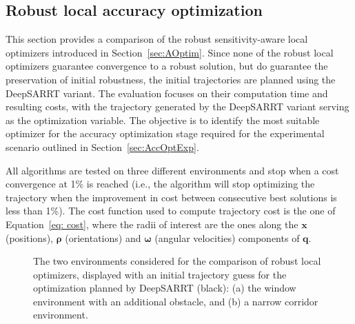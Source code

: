 \subsection{Robust local accuracy optimization} \label{sec:AccOptSimu}

This section provides a comparison of the robust sensitivity-aware local optimizers introduced in Section~\ref{sec:AOptim}. 
Since none of the robust local optimizers guarantee convergence to a robust solution, but do guarantee the preservation of initial robustness, the initial trajectories are planned using the DeepSARRT variant.
The evaluation focuses on their computation time and resulting costs, with the trajectory generated by the DeepSARRT variant serving as the optimization variable.
The objective is to identify the most suitable optimizer for the accuracy optimization stage required for the experimental scenario outlined in Section~\ref{sec:AccOptExp}.

All algorithms are tested on three different environments and stop when a cost convergence at 1\% is reached (i.e., the algorithm will stop optimizing the trajectory when the improvement in cost between consecutive best solutions is less than 1\%).
The cost function used to compute trajectory cost is the one of Equation~\eqref{eq: cost}, where the radii of interest are the ones along the $\boldsymbol{x}$ (positions), $\boldsymbol{\rho}$ (orientations) and $\boldsymbol{\omega}$ (angular velocities) components of $\boldsymbol{q}$.

\begin{figure} [h!]
    \centering
    \caption{The two environments considered for the comparison of robust local optimizers, displayed with an initial trajectory guess for the optimization planned by DeepSARRT (black):
    (a) the window environment with an additional obstacle, and (b) a narrow corridor environment.}%
\end{figure}

